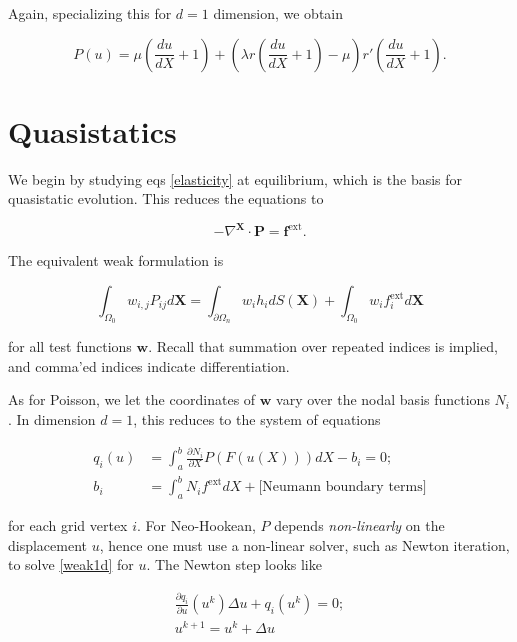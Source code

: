 \documentclass{article}
\begin{document}
Again, specializing this for \(d = 1\) dimension, we obtain

\begin{equation}\label{P1d}
P(u) = \mu \left( \frac{du}{dX} + 1 \right) + \left( \lambda r \left( \frac{du}{dX} + 1 \right) - \mu \right) r' \left( \frac{du}{dX} + 1 \right).
\end{equation}

\section{Quasistatics}

We begin by studying eqs \eqref{elasticity} at equilibrium, which is the basis for quasistatic evolution.  This reduces the equations to

\begin{equation}\label{quasistatics}
-\nabla^{\mathbf{X}} \cdot \mathbf{P} = \mathbf{f}^{\text{ext}}.
\end{equation}

The equivalent weak formulation is

\begin{equation}
\int_{\Omega_0} w_{i,j} P_{ij} d\mathbf{X} = \int_{\partial \Omega_n} w_i h_i dS(\mathbf{X}) + \int_{\Omega_0} w_i f_i^{\text{ext}} d\mathbf{X}
\end{equation}

for all test functions \(\mathbf{w}\).  Recall that summation over repeated indices is implied, and comma'ed indices indicate differentiation.

As for Poisson, we let the coordinates of \(\mathbf{w}\) vary over the nodal basis functions \(N_i\).  In dimension \(d = 1\), this reduces to the system of equations

\begin{subequations}\label{weak1d}
\begin{align}
q_i(u) & = \int_a^b \frac{\partial N_i}{\partial X} P(F(u(X))) dX - b_i = 0; \\
b_i & = \int_a^b N_i f^{\text{ext}} dX + \text{[Neumann boundary terms]}
\end{align}
\end{subequations}

for each grid vertex \(i\).  For Neo-Hookean, \(P\) depends {\em non-linearly} on the displacement \(u\), hence one must use a non-linear solver, such as Newton iteration, to solve \eqref{weak1d} for \(u\).  The Newton step looks like

\begin{subequations}
\begin{align}
\frac{\partial q_i}{\partial u} \left( u^k \right) \Delta u + q_i \left( u^k \right) = 0; \\
u^{k+1} = u^k + \Delta u
\end{align}
\end{subequations}
\end{document}
